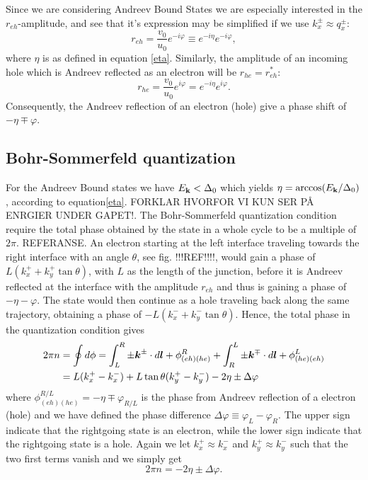 Since we are considering Andreev Bound States we are especially interested in the $r_{eh}$-amplitude, and see that it's expression may be simplified if we use $k_x^{\pm}\approx q_x^{\pm}$:
\begin{equation}
    r_{eh} =\frac{v_0}{u_0}e^{-i\varphi}\equiv e^{-i\eta}e^{-i\varphi},
\end{equation}
where $\eta$ is as defined in equation \eqref{eta}. Similarly, the amplitude of an incoming hole which is Andreev reflected as an electron will be $r_{he}=r_{eh}^*$:
\begin{equation}
    r_{he} = \frac{v_0}{u_0}e^{i\varphi} = e^{-i\eta}e^{i\varphi}.
\end{equation}
Consequently, the Andreev reflection of an electron (hole) give a phase shift of $-\eta \mp \varphi$.

\subsection{Bohr-Sommerfeld quantization}
For the Andreev Bound states we have $E_{\mathbf{k}}<\Delta_0$ which yields $\eta = \arccos(E_{\mathbf{k}}/\Delta_0)$, according to equation\eqref{eta}. FORKLAR HVORFOR VI KUN SER PÅ ENRGIER UNDER GAPET!. The Bohr-Sommerfeld quantization condition require the total phase obtained by the state in a whole cycle to be a multiple of $2\pi$. REFERANSE. An electron starting at the left interface traveling towards the right interface with an angle $\theta$, see fig. !!!REF!!!!, would gain a phase of $L(k_x^+ + k_y^+\tan\theta)$, with $L$ as the length of the junction, before it is Andreev reflected at the interface with the amplitude $r_{eh}$ and thus is gaining a phase of $-\eta - \varphi$. The state would then continue as a hole traveling back along the same trajectory, obtaining a phase of $-L(k_x^-+ k_y^-\tan\theta)$. Hence, the total phase in the quantization condition gives
\begin{equation}
\begin{split}
    2\pi n &= \oint d\phi = \int_{L}^{R}\pm \boldsymbol{k}^{\pm}\cdot d\boldsymbol{l} + \phi^R_{(eh)(he)} + \int_{R}^{L}\pm \boldsymbol{k}^{\mp}\cdot d\boldsymbol{l} + \phi^L_{(he)(eh)}\\
    &=L(k_x^+-k_x^-)+L\tan\theta(k_y^+-k_y^-) - 2\eta \pm \Delta\varphi
\end{split}
\label{quantization1}
\end{equation}
where $\phi^{R/L}_{(eh)(he)} = -\eta \mp \varphi_{R/L}$ is the phase from Andreev reflection of a electron (hole) and we have defined the phase difference $\Delta\varphi \equiv \varphi_L-\varphi_R$. The upper sign indicate that the rightgoing state is an electron, while the lower sign indicate that the rightgoing state is a hole. Again we let $k_x^+\approx k_x^-$ and $k_y^+\approx k_y^-$ such that the two first terms vanish and we simply get
\begin{equation}
2\pi n = -2\eta \pm \Delta\varphi.
\label{quantization1}
\end{equation}

